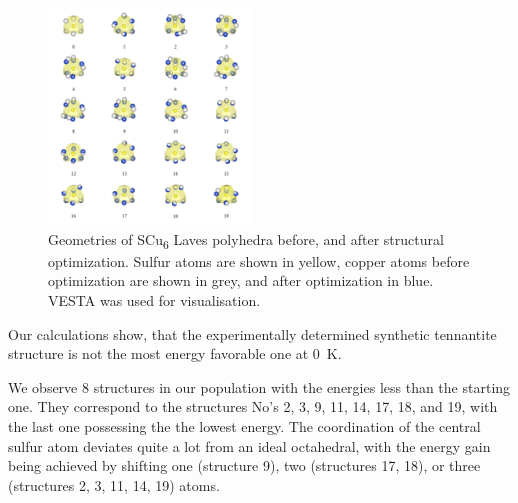 \documentclass[preprint,review,12pt]{elsarticle}
\begin{document}
\begin{figure}
\centering
 \includegraphics[width=0.48\textwidth]{Init_and_opt_renamed}
 \caption{\label{fig:init_and_opt_laves} Geometries of SCu\textsubscript{6} Laves polyhedra before, and after structural optimization. Sulfur atoms are shown in yellow, copper atoms before optimization are shown in grey, and after optimization in blue. VESTA\cite{Momma2011} was used for visualisation. }
\end{figure}

Our calculations show, that the experimentally determined synthetic tennantite structure is not the most energy favorable one at 0~K.

We observe 8 structures in our population with the energies less than the starting one.
They correspond to the structures No's 2, 3, 9, 11, 14, 17, 18, and 19, with the last one  possessing the the lowest energy.
The coordination of the central sulfur atom deviates quite a lot from an ideal octahedral, with the energy gain being achieved by shifting one (structure 9), two (structures 17, 18), or three (structures 2, 3, 11, 14, 19) atoms.

%
\end{document}
